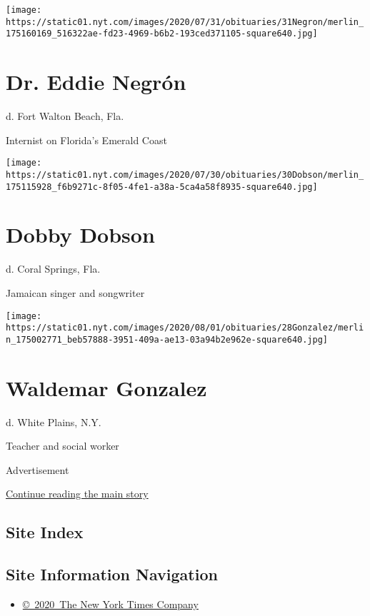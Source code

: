 \texttt{[image: https://static01.nyt.com/images/2020/07/31/obituaries/31Negron/merlin\_175160169\_516322ae-fd23-4969-b6b2-193ced371105-square640.jpg]}

\hypertarget{dr-eddie-negruxf3n}{%
\section{Dr. Eddie Negrón}\label{dr-eddie-negruxf3n}}

d. Fort Walton Beach, Fla.

Internist on Florida's Emerald Coast

\texttt{[image: https://static01.nyt.com/images/2020/07/30/obituaries/30Dobson/merlin\_175115928\_f6b9271c-8f05-4fe1-a38a-5ca4a58f8935-square640.jpg]}

\hypertarget{dobby-dobson}{%
\section{Dobby Dobson}\label{dobby-dobson}}

d. Coral Springs, Fla.

Jamaican singer and songwriter

\texttt{[image: https://static01.nyt.com/images/2020/08/01/obituaries/28Gonzalez/merlin\_175002771\_beb57888-3951-409a-ae13-03a94b2e962e-square640.jpg]}

\hypertarget{waldemar-gonzalez}{%
\section{Waldemar Gonzalez}\label{waldemar-gonzalez}}

d. White Plains, N.Y.

Teacher and social worker

Advertisement

\protect\hyperlink{after-bottom}{Continue reading the main story}

\hypertarget{site-index}{%
\subsection{Site Index}\label{site-index}}

\hypertarget{site-information-navigation}{%
\subsection{Site Information
Navigation}\label{site-information-navigation}}

\begin{itemize}
\tightlist
\item
  \href{https://help.nytimes.com/hc/en-us/articles/115014792127-Copyright-notice}{©~2020~The
  New York Times Company}
\end{itemize}

